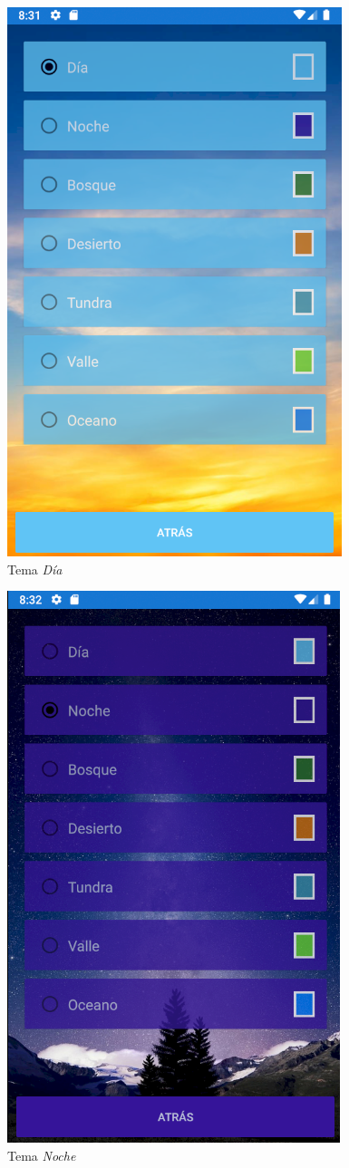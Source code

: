 \begin{figure}[H]
    \centering
    \includegraphics[scale=0.7]{Figures/Capturas/TemaDia.png}
    \caption{Tema \textit{Día}}
    \label{Noche}    
\end{figure}
\begin{figure}[H]
    \centering
    \includegraphics[scale=0.7]{Figures/Capturas/TemaNoche.png}
    \caption{Tema \textit{Noche}}
    \label{Dia}    
\end{figure}
